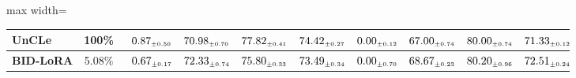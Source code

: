 \begin{table}[!htbp]
\begin{adjustbox}{max width=\textwidth}
\begin{tabular}{l|c|cccc|cccc}
UnCLe & 100\% & $\kern6pt0.87_{\scriptscriptstyle \pm 0.50}\kern-6pt$ & $\kern6pt70.98_{\scriptscriptstyle \pm 0.70}\kern-6pt$ & \colorbox{yellow!35}{$\kern6pt77.82_{\scriptscriptstyle \pm 0.41}\kern-6pt$} & \colorbox{yellow!35}{$\kern6pt74.42_{\scriptscriptstyle \pm 0.27}\kern-6pt$} & $\kern6pt0.00_{\scriptscriptstyle \pm 0.12}\kern-6pt$ & $\kern6pt67.00_{\scriptscriptstyle \pm 0.74}\kern-6pt$ & $\kern6pt80.00_{\scriptscriptstyle \pm 0.74}\kern-6pt$ & $\kern6pt71.33_{\scriptscriptstyle \pm 0.12}\kern-6pt$ \\
\midrule
\rowcolor{pink!15}
\textbf{BID-LoRA} & 5.08\% & $\kern6pt0.67_{\scriptscriptstyle \pm 0.17}\kern-6pt$ & \colorbox{yellow!35}{$\kern6pt72.33_{\scriptscriptstyle \pm 0.74}\kern-6pt$} & $\kern6pt75.80_{\scriptscriptstyle \pm 0.33}\kern-6pt$ & $\kern6pt73.49_{\scriptscriptstyle \pm 0.34}\kern-6pt$ & $\kern6pt0.00_{\scriptscriptstyle \pm 0.70}\kern-6pt$ & \colorbox{green!25}{$\kern6pt68.67_{\scriptscriptstyle \pm 0.23}\kern-6pt$} & $\kern6pt80.20_{\scriptscriptstyle \pm 0.96}\kern-6pt$ & \colorbox{yellow!35}{$\kern6pt72.51_{\scriptscriptstyle \pm 0.24}\kern-6pt$} \\
\bottomrule
\end{tabular}
\end{adjustbox}
\end{table}

